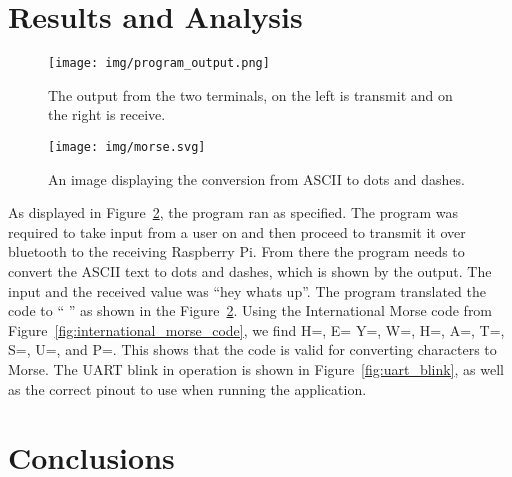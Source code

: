 \documentclass[11pt]{article}
\begin{document}
\section{Results and Analysis}
\label{sec:results_and_analysis}


\begin{figure}[ht]
    \centering
    \texttt{[image: img/program\_output.png]}
    \caption{The output from the two terminals, on the left is transmit and on the right is receive.}
    \label{fig:program_output}
\end{figure}


\begin{figure}[ht]
    \centering
    \texttt{[image: img/morse.svg]}
    \caption{An image displaying the conversion from ASCII to dots and dashes.}
    \label{fig:program_output}
\end{figure}


As displayed in Figure~\ref{fig:program_output}, the program ran as specified.
The program was required to take input from a user on and then proceed to transmit it over bluetooth to the receiving Raspberry Pi.
From there the program needs to convert the ASCII text to dots and dashes, which is shown by the output.
The input and the received value was ``hey whats up''.
The program translated the code to ``\mcdot{}\mcdot{}\mcdot{}\mcdot{} \mcdot{} \mcdash{}\mcdot{}\mcdash{}\mcdash{}   \mcdot{}\mcdash{}\mcdash{} \mcdot{}\mcdot{}\mcdot{}\mcdot{} \mcdot{}\mcdash{} \mcdash{} \mcdot{}\mcdot{}\mcdot{}   \mcdot{}\mcdot{}\mcdash{} \mcdot{}\mcdash{}\mcdash{}\mcdot{}'' as shown in the Figure~\ref{fig:program_output}.
Using the International Morse code from Figure~\ref{fig:international_morse_code}, we find H=\mcdot{}\mcdot{}\mcdot{}\mcdot{}, E=\mcdot{} Y=\mcdash{}\mcdot{}\mcdash{}\mcdash{}, W=\mcdot{}\mcdash{}\mcdash{}, H=\mcdot{}\mcdot{}\mcdot{}\mcdot{}, A=\mcdot{}\mcdash{}, T=\mcdash{}, S=\mcdot{}\mcdot{}\mcdot{}, U=\mcdot{}\mcdot{}\mcdash{}, and P=\mcdot{}\mcdash{}\mcdash{}\mcdot{}.
This shows that the code is valid for converting characters to Morse.
The UART blink in operation is shown in Figure~\ref{fig:uart_blink}, as well as the correct pinout to use when running the application.


\section{Conclusions}
\label{sec:conclusions}
\end{document}

